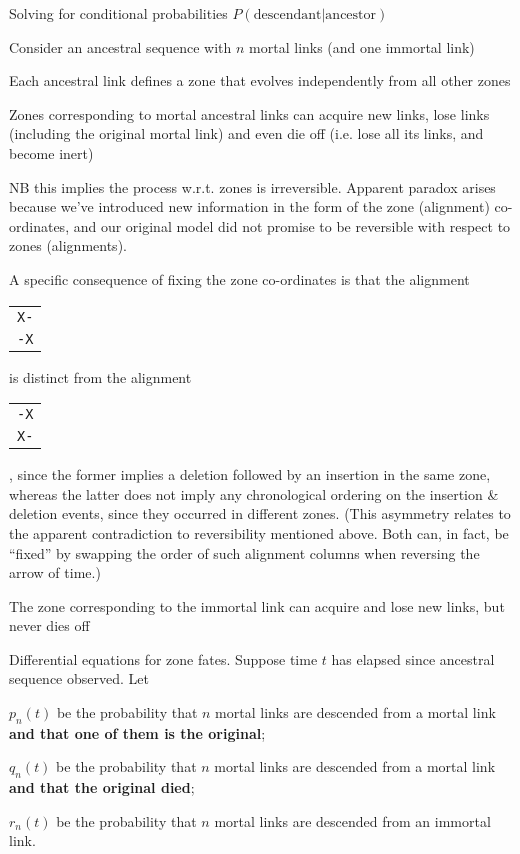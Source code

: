 \documentclass{beamer}
\begin{document}
\begin{frame}{}

Solving for conditional probabilities $P(\mbox{descendant}|\mbox{ancestor})$ %
 \itemb
 \item Consider an ancestral sequence with $n$ mortal links (and one immortal link)
 \item Each ancestral link defines a zone that evolves independently from all other zones
 \item Zones corresponding to mortal ancestral links can acquire new links, lose links (including the original mortal link) and even die off
(i.e. lose all its links, and become inert)
  \itemb
  \item NB this implies the process w.r.t. zones is irreversible. Apparent paradox arises because we've introduced new information
in the form of the zone (alignment) co-ordinates, and our original model did not promise to be reversible with respect to zones (alignments).
  \iteme
 \iteme
\end{frame}

\begin{frame}{}
\itemb
  \item A specific consequence of fixing the zone co-ordinates is that the alignment
\begin{tabular}{l} {\tt X-} \\ {\tt -X} \end{tabular}
is distinct from the alignment
\begin{tabular}{l} {\tt -X} \\ {\tt X-} \end{tabular},
since the former implies a deletion followed by an insertion in the same zone,
whereas the latter does not imply any chronological ordering on the insertion \& deletion events, since they occurred in different zones.
(This asymmetry relates to the apparent contradiction to reversibility mentioned above. Both can, in fact, be ``fixed'' by swapping the order of such alignment columns when reversing the arrow of time.)
 \item The zone corresponding to the immortal link can acquire and lose new links, but never dies off
\iteme
\end{frame}

\begin{frame}{}
\itemb
 \item Differential equations for zone fates. Suppose time $t$ has elapsed since ancestral sequence observed. Let
  \itemb
  \item $p_n(t)$ be the probability that $n$ mortal links are descended from a mortal link {\bf and that one of them is the original};
  \item $q_n(t)$ be the probability that $n$ mortal links are descended from a mortal link {\bf and that the original died};
  \item $r_n(t)$ be the probability that $n$ mortal links are descended from an immortal link.
  \iteme
\iteme
\end{frame}
\end{document}
